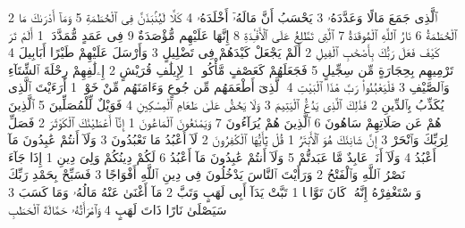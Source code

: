 {\tiny\colorbox{cl_aya}{2}} ٱلَّذِى جَمَعَ مَالًا وَعَدَّدَهُۥ
{\tiny\colorbox{cl_aya}{3}} يَحْسَبُ أَنَّ مَالَهُۥٓ أَخْلَدَهُۥ
{\tiny\colorbox{cl_aya}{4}} كَلَّا لَيُنۢبَذَنَّ فِى ٱلْحُطَمَةِ
{\tiny\colorbox{cl_aya}{5}} وَمَآ أَدْرَىٰكَ مَا ٱلْحُطَمَةُ
{\tiny\colorbox{cl_aya}{6}} نَارُ ٱللَّهِ ٱلْمُوقَدَةُ
{\tiny\colorbox{cl_aya}{7}} ٱلَّتِى تَطَّلِعُ عَلَى ٱلْأَفْـِٔدَةِ
{\tiny\colorbox{cl_aya}{8}} إِنَّهَا عَلَيْهِم مُّؤْصَدَةٌ
{\tiny\colorbox{cl_aya}{9}} فِى عَمَدٍ مُّمَدَّدَةٍۭ
{\tiny\colorbox{cl_aya}{1}} أَلَمْ تَرَ كَيْفَ فَعَلَ رَبُّكَ بِأَصْحَٰبِ ٱلْفِيلِ
{\tiny\colorbox{cl_aya}{2}} أَلَمْ يَجْعَلْ كَيْدَهُمْ فِى تَضْلِيلٍ
{\tiny\colorbox{cl_aya}{3}} وَأَرْسَلَ عَلَيْهِمْ طَيْرًا أَبَابِيلَ
{\tiny\colorbox{cl_aya}{4}} تَرْمِيهِم بِحِجَارَةٍ مِّن سِجِّيلٍ
{\tiny\colorbox{cl_aya}{5}} فَجَعَلَهُمْ كَعَصْفٍ مَّأْكُولٍۭ
{\tiny\colorbox{cl_aya}{1}} لِإِيلَٰفِ قُرَيْشٍ
{\tiny\colorbox{cl_aya}{2}} إِۦلَٰفِهِمْ رِحْلَةَ ٱلشِّتَآءِ وَٱلصَّيْفِ
{\tiny\colorbox{cl_aya}{3}} فَلْيَعْبُدُوا۟ رَبَّ هَٰذَا ٱلْبَيْتِ
{\tiny\colorbox{cl_aya}{4}} ٱلَّذِىٓ أَطْعَمَهُم مِّن جُوعٍ وَءَامَنَهُم مِّنْ خَوْفٍۭ
{\tiny\colorbox{cl_aya}{1}} أَرَءَيْتَ ٱلَّذِى يُكَذِّبُ بِٱلدِّينِ
{\tiny\colorbox{cl_aya}{2}} فَذَٰلِكَ ٱلَّذِى يَدُعُّ ٱلْيَتِيمَ
{\tiny\colorbox{cl_aya}{3}} وَلَا يَحُضُّ عَلَىٰ طَعَامِ ٱلْمِسْكِينِ
{\tiny\colorbox{cl_aya}{4}} فَوَيْلٌ لِّلْمُصَلِّينَ
{\tiny\colorbox{cl_aya}{5}} ٱلَّذِينَ هُمْ عَن صَلَاتِهِمْ سَاهُونَ
{\tiny\colorbox{cl_aya}{6}} ٱلَّذِينَ هُمْ يُرَآءُونَ
{\tiny\colorbox{cl_aya}{7}} وَيَمْنَعُونَ ٱلْمَاعُونَ
{\tiny\colorbox{cl_aya}{1}} إِنَّآ أَعْطَيْنَٰكَ ٱلْكَوْثَرَ
{\tiny\colorbox{cl_aya}{2}} فَصَلِّ لِرَبِّكَ وَٱنْحَرْ
{\tiny\colorbox{cl_aya}{3}} إِنَّ شَانِئَكَ هُوَ ٱلْأَبْتَرُ
{\tiny\colorbox{cl_aya}{1}} قُلْ يَٰٓأَيُّهَا ٱلْكَٰفِرُونَ
{\tiny\colorbox{cl_aya}{2}} لَآ أَعْبُدُ مَا تَعْبُدُونَ
{\tiny\colorbox{cl_aya}{3}} وَلَآ أَنتُمْ عَٰبِدُونَ مَآ أَعْبُدُ
{\tiny\colorbox{cl_aya}{4}} وَلَآ أَنَا۠ عَابِدٌ مَّا عَبَدتُّمْ
{\tiny\colorbox{cl_aya}{5}} وَلَآ أَنتُمْ عَٰبِدُونَ مَآ أَعْبُدُ
{\tiny\colorbox{cl_aya}{6}} لَكُمْ دِينُكُمْ وَلِىَ دِينِ
{\tiny\colorbox{cl_aya}{1}} إِذَا جَآءَ نَصْرُ ٱللَّهِ وَٱلْفَتْحُ
{\tiny\colorbox{cl_aya}{2}} وَرَأَيْتَ ٱلنَّاسَ يَدْخُلُونَ فِى دِينِ ٱللَّهِ أَفْوَاجًا
{\tiny\colorbox{cl_aya}{3}} فَسَبِّحْ بِحَمْدِ رَبِّكَ وَٱسْتَغْفِرْهُ إِنَّهُۥ كَانَ تَوَّابًۢا
{\tiny\colorbox{cl_aya}{1}} تَبَّتْ يَدَآ أَبِى لَهَبٍ وَتَبَّ
{\tiny\colorbox{cl_aya}{2}} مَآ أَغْنَىٰ عَنْهُ مَالُهُۥ وَمَا كَسَبَ
{\tiny\colorbox{cl_aya}{3}} سَيَصْلَىٰ نَارًا ذَاتَ لَهَبٍ
{\tiny\colorbox{cl_aya}{4}} وَٱمْرَأَتُهُۥ حَمَّالَةَ ٱلْحَطَبِ
